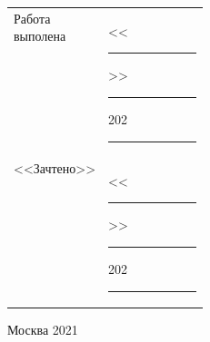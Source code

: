 \begin{flushleft}
	\begin{tabular}{p{0.25\linewidth}l}

		Работа выполена & <<\noindent\rule{2em}{1pt}>>
		                    \noindent\rule{5em}{1pt} 202\noindent\rule{1em}{1pt} \\

		<<Зачтено>> & <<\noindent\rule{2em}{1pt}>>
		\noindent\rule{5em}{1pt} 202\noindent\rule{1em}{1pt} \\

	\end{tabular}
\end{flushleft}

\normalsize
\begin{center}	
\vfill 
Москва 2021
\end{center}
